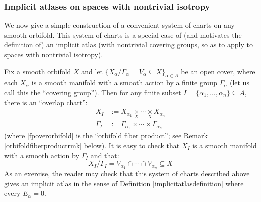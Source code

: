\documentclass[12pt]{article}
\theoremstyle{definition}
\theoremstyle{remark}
\numberwithin{equation}{subsection}
\begin{document}
\subsubsection{Implicit atlases on spaces with nontrivial isotropy}\label{isotropyintrosec}

We now give a simple construction of a convenient system of charts on any smooth orbifold.  This system of charts is a special case of (and motivates the definition of) an implicit atlas (with nontrivial covering groups, so as to apply to spaces with nontrivial isotropy).

Fix a smooth orbifold $X$ and let $\{X_\alpha/\Gamma_\alpha=V_\alpha\subseteq X\}_{\alpha\in A}$ be an open cover, where each $X_\alpha$ is a smooth manifold with a smooth action by a finite group $\Gamma_\alpha$ (let us call this the ``covering group'').  Then for any finite subset $I=\{\alpha_1,\ldots,\alpha_n\}\subseteq A$, there is an ``overlap chart'':
\begin{align}
\label{fpoverorbifold}X_I&:=X_{\alpha_1}\underset X\times\cdots\underset X\times X_{\alpha_n}\\
\Gamma_I&:=\Gamma_{\alpha_1}\times\cdots\times\Gamma_{\alpha_n}
\end{align}
(where \eqref{fpoverorbifold} is the ``orbifold fiber product''; see Remark \ref{orbifoldfiberproductrmk} below).  It is easy to check that $X_I$ is a smooth manifold with a smooth action by $\Gamma_I$ and that:
\begin{equation}
X_I/\Gamma_I=V_{\alpha_1}\cap\cdots\cap V_{\alpha_n}\subseteq X
\end{equation}
As an exercise, the reader may check that this system of charts described above gives an implicit atlas in the sense of Definition \ref{implicitatlasdefinition} where every $E_\alpha=0$.
\end{document}

